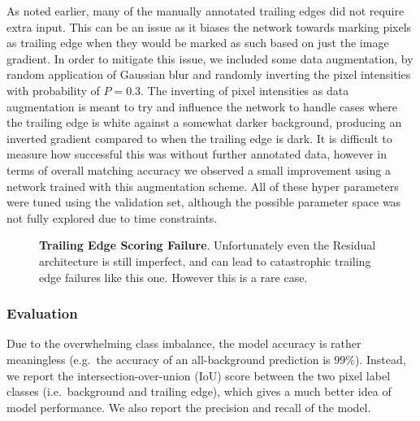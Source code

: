 As noted earlier, many of the manually annotated trailing edges did not require extra input.
This can be an issue as it biases the network towards marking pixels as trailing edge when they would be marked as such based on just the image gradient.
In order to mitigate this issue, we included some data augmentation, by random application of Gaussian blur and randomly inverting the pixel intensities with probability of $P=0.3$.
The inverting of pixel intensities as data augmentation is meant to try and influence the network to handle cases where the trailing edge is white against a somewhat darker background, producing an inverted gradient compared to when the trailing edge is dark.
It is difficult to measure how successful this was without further annotated data, however in terms of overall matching accuracy we observed a small improvement using a network trained with this augmentation scheme.
All of these hyper parameters were tuned using the validation set, although the possible parameter space was not fully explored due to time constraints.

\begin{figure}[t]%
\centering
{}
\caption{\textbf{Trailing Edge Scoring Failure}. Unfortunately even the Residual architecture is still imperfect, and can lead to catastrophic trailing edge failures like this one. However this is a rare case.}
\label{fig:example_te_res_failure}
\end{figure}



\subsubsection{Evaluation}

Due to the overwhelming class imbalance, the model accuracy is rather meaningless (e.g.\ the accuracy of an all-background prediction is $99\%$).
Instead, we report the intersection-over-union (IoU) score between the two pixel label classes (i.e.\ background and trailing edge), which gives a much better idea of model performance.
We also report the precision and recall of the model.

